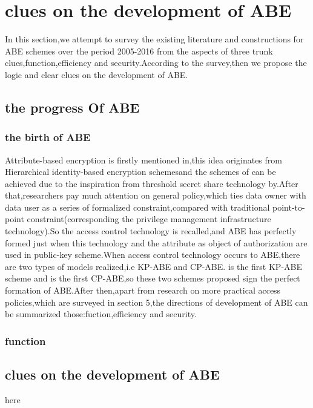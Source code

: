 \section{clues on the development of ABE}
In this section,we attempt to survey the existing literature and constructions for ABE schemes over the period 2005-2016 from the aspects of three trunk clues,function,efficiency and security.According to the survey,then we propose the logic and clear clues on the development of ABE.
\subsection{the progress Of ABE}
\subsubsection{the birth of ABE}Attribute-based encryption is firstly mentioned in\cite{fuzz},this idea originates from Hierarchical identity-based encryption schemes\cite{Yao:Id-based encryption for complex hierarchies with applications to forward security and broadcast encryption}and the schemes of \cite{fuzz} can be achieved due to the inspiration from threshold secret share technology by\cite{ Adi Shamir:How to Share a Secret}.After that,researchers pay much attention on general policy,which ties data owner with data user as a series of formalized constraint,compared with traditional point-to-point constraint(corresponding the privilege management infrastructure technology).So the access control technology is recalled,and ABE has perfectly formed just when this technology and the attribute as object of authorization are used in public-key scheme.When access control technology occurs to ABE,there are two types of models realized,i.e KP-ABE and CP-ABE.\cite{classical:KP-ABE} is the first KP-ABE scheme and \cite{first:CP-ABE} is the first CP-ABE,so these two schemes proposed sign the perfect formation of ABE.After then,apart from research on more practical access policies,which are surveyed in section 5,the directions of development of ABE can be summarized those:fuction,efficiency and security.
\subsubsection{function}

\subsection{clues on the development of ABE}
here
